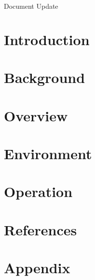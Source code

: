 \documentclass{article}
\title{}
\author{}
\date{}
\begin{document}
    

    \tableofcontents
    \listoffigures

    \newpage
    \begin{versionhistory}
		 {Document Update}
    \end{versionhistory}
    \newpage

    \section{Introduction}
		
    \section{Background}

    \section{Overview}

    \section{Environment}

    \section{Operation}

    \section*{References}

    \appendix
    \section{Appendix}
\end{document}
